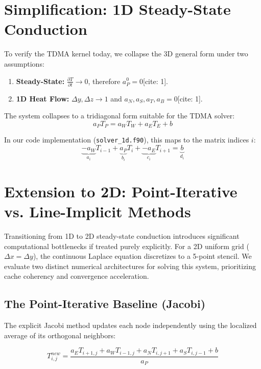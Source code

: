\section{Simplification: 1D Steady-State Conduction}
To verify the TDMA kernel today, we collapse the 3D general form under two assumptions:
\begin{enumerate}
    \item \textbf{Steady-State:} $\frac{\partial T}{\partial t} \rightarrow 0$, therefore $a_P^0 = 0$[cite: 1].
    \item \textbf{1D Heat Flow:} $\Delta y, \Delta z \rightarrow 1$ and $a_N, a_S, a_T, a_B = 0$[cite: 1].
\end{enumerate}

The system collapses to a tridiagonal form suitable for the TDMA solver:
\begin{equation}
    a_P T_P = a_W T_W + a_E T_E + b
\end{equation}

In our code implementation (\texttt{solver\_1d.f90}), this maps to the matrix indices $i$:
\begin{equation}
    \underbrace{-a_W}_{a_i} T_{i-1} + \underbrace{a_P}_{b_i} T_i + \underbrace{-a_E}_{c_i} T_{i+1} = \underbrace{b}_{d_i}
\end{equation}


\section{Extension to 2D: Point-Iterative vs. Line-Implicit Methods}

Transitioning from 1D to 2D steady-state conduction introduces significant computational bottlenecks if treated purely explicitly. For a 2D uniform grid ($\Delta x = \Delta y$), the continuous Laplace equation discretizes to a 5-point stencil. We evaluate two distinct numerical architectures for solving this system, prioritizing cache coherency and convergence acceleration.

\subsection{The Point-Iterative Baseline (Jacobi)}



The explicit Jacobi method updates each node independently using the localized average of its orthogonal neighbors:

\begin{equation}
    T_{i,j}^{new} = \frac{a_E T_{i+1,j} + a_W T_{i-1,j} + a_N T_{i,j+1} + a_S T_{i,j-1} + b}{a_P}
\end{equation}

